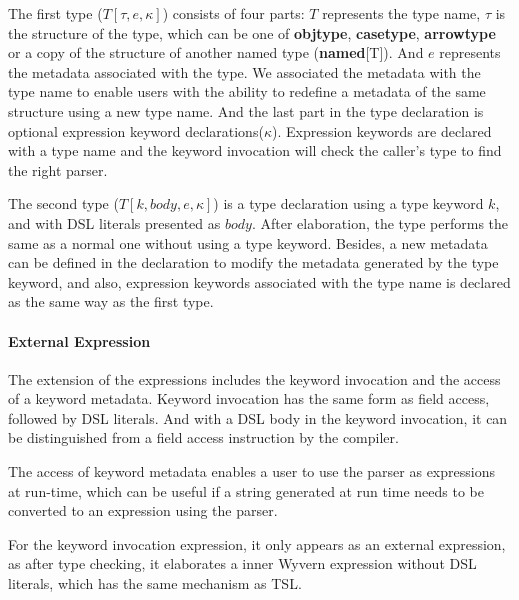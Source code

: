 \documentclass{sig-alternate}
\begin{document}
The first type ($T[\tau,e,\kappa]$) consists of four parts: $T$ represents the type name, $\tau$ is the structure of the type, which can be one of \textbf{objtype}, \textbf{casetype}, \textbf{arrowtype} or a copy of the structure of another named type (\textbf{named}[T]). And $e$ represents the metadata associated with the type. We associated the metadata with the type name to enable users with the ability to redefine a metadata of the same structure using a new type name. And the last part in the type declaration is optional expression keyword declarations($\kappa$). Expression keywords are declared with a type name and the keyword invocation will check the caller's type to find the right parser.

The second type ($T[k,body,e,\kappa]$) is a type declaration using a type keyword $k$, and with DSL literals presented as $body$. After elaboration, the type performs the same as a normal one without using a type keyword. Besides, a new metadata can be defined in the declaration to modify the metadata generated by the type keyword, and also, expression keywords associated with the type name is declared as the same way as the first type.

\paragraph{External Expression}
The extension of the expressions includes the keyword invocation and the access of a keyword metadata. Keyword invocation has the same form as field access, followed by DSL literals. And with a DSL body in the keyword invocation, it can be distinguished from a field access instruction by the compiler.

The access of keyword metadata enables a user to use the parser as expressions at run-time, which can be useful if a string generated at run time needs to be converted to an expression using the parser.

For the keyword invocation expression, it only appears as an external expression, as after type checking, it elaborates a inner Wyvern expression without DSL literals, which has the same mechanism as TSL. 
\end{document}
